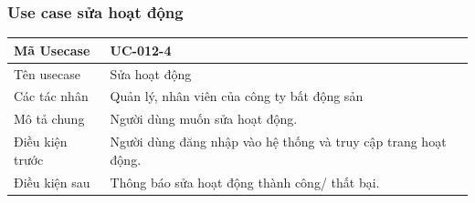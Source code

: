 \documentclass[12pt,a4paper]{article}
\begin{document}
    \subsubsection*{Use case sửa hoạt động }
    \begin{table}[H]
        \centering
        \begin{tabular}{|p{3.5cm}|p{11.5cm}|c|}
            \hline
            Mã Usecase      & UC-012-4                                                       \\
            \hline
            Tên usecase     & Sửa hoạt động                                                  \\
            \hline
            Các tác nhân    & Quản lý, nhân viên của công ty bất động sản                    \\
            \hline
            Mô tả chung     & Người dùng muốn sửa hoạt động.                                 \\
            \hline

            Điều kiện trước & Người dùng đăng nhập vào hệ thống và truy cập trang hoạt động. \\
            \hline

            Điều kiện sau   & Thông báo sửa hoạt động thành công/ thất bại.                  \\
            \hline


\end{tabular}
\end{table}
\end{document}
